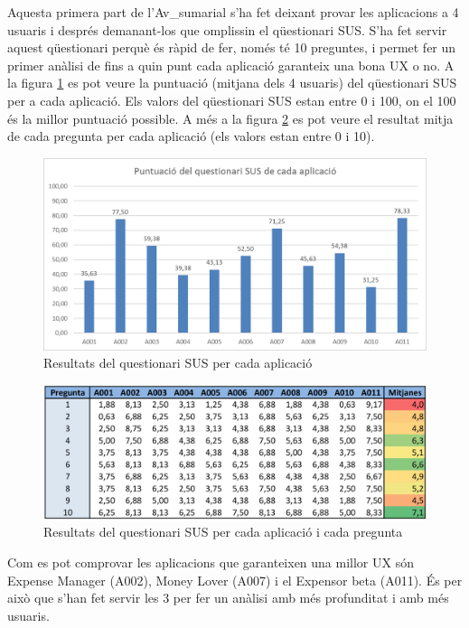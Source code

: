 Aquesta primera part de l'\gls{Av_sumarial} s'ha fet deixant provar les aplicacions a 4 usuaris i després demanant-los que omplissin el qüestionari SUS. S'ha fet servir aquest qüestionari perquè és ràpid de fer, només té 10 preguntes, i permet fer un primer anàlisi de fins a quin punt cada aplicació garanteix una bona \ac{UX} o no. A la figura \ref{fig:SUS_analisi} es pot veure la puntuació (mitjana dels 4 usuaris) del qüestionari SUS per a cada aplicació. Els valors del qüestionari SUS estan entre 0 i 100, on el 100 és la millor puntuació possible. A més a la figura \ref{fig:SUS_table} es pot veure el resultat mitja de cada pregunta per cada aplicació (els valors estan entre 0 i 10).

\begin{figure}[htp]
\centering
\includegraphics[scale=0.8]{SUS_analisi_1.png}
\caption{Resultats del questionari SUS per cada aplicació}\label{fig:SUS_analisi}
\end{figure}

\begin{figure}[htp]
\centering
\includegraphics[scale=0.9]{SUS_table_2.png}
\caption{Resultats del questionari SUS per cada aplicació i cada pregunta}\label{fig:SUS_table}
\end{figure}

Com es pot comprovar les aplicacions que garanteixen una millor \ac{UX} són Expense Manager (A002), Money Lover (A007) i el Expensor beta (A011). És per això que s'han fet servir les 3 per fer un anàlisi amb més profunditat i amb més usuaris.

